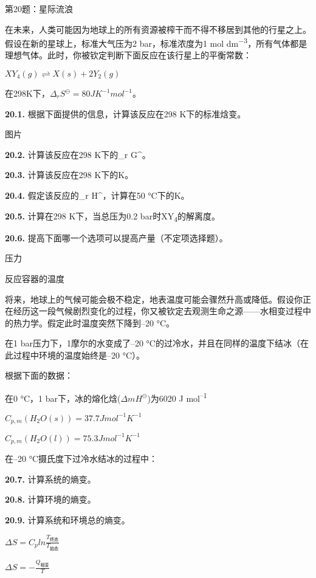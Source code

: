 
第20题：星际流浪

在未来，人类可能因为地球上的所有资源被榨干而不得不移居到其他的行星之上。假设在新的星球上，标准大气压为2
bar，标准浓度为1 mol
dm\textsuperscript{−3}，所有气体都是理想气体。此时，你被钦定判断下面反应在该行星上的平衡常数：

\(XY_4(g) \rightleftharpoons X(s) + 2 Y_2(g)\)

在298K下，\(\Delta _r S^\ominus = 80 J K^{-1}mol^{-1}\)。

\textbf{20.1.} 根据下面提供的信息，计算该反应在298 K下的标准焓变。

图片

\textbf{20.2.} 计算该反应在298 K下的\Delta \_r G\^{}\ominus。

\textbf{20.3.} 计算该反应在298 K下的K\ominus。

\textbf{20.4.} 假定该反应的\Delta \_r
H\^{}，计算在50 °C下的K。

\textbf{20.5.} 计算在298 K下，当总压为0.2
bar时XY\textsubscript{4}的解离度。

\textbf{20.6. } 提高下面哪一个选项可以提高产量（不定项选择题）。

压力

反应容器的温度

将来，地球上的气候可能会极不稳定，地表温度可能会骤然升高或降低。假设你正在经历这一段气候剧烈变化的过程，你又被钦定去观测生命之源------水相变过程中的热力学。假定此时温度突然下降到--20
°C。

在1 bar压力下，1摩尔的水变成了--20
°C的过冷水，并且在同样的温度下结冰（在此过程中环境的温度始终是--20
°C）。

根据下面的数据：

在0 °C，1 bar下，冰的熔化焓(\(\Delta m H^\ominus\))为6020 J
mol\textsuperscript{--1}

\(C_{p,m}(H_2O(s)) = 37.7 J mol^{-1} K^{-1}\)

\(C_{p,m}(H_2O(l)) = 75.3 J mol^{-1} K^{-1}\)

在--20 °C摄氏度下过冷水结冰的过程中：

\textbf{20.7.} 计算系统的熵变。

\textbf{20.8.} 计算环境的熵变。

\textbf{20.9.} 计算系统和环境总的熵变。

\(\Delta S = C_p ln \frac{T_{终态}}{T_{始态}}\)

\(\Delta S = - \frac{Q_{相变}}{T}\)


